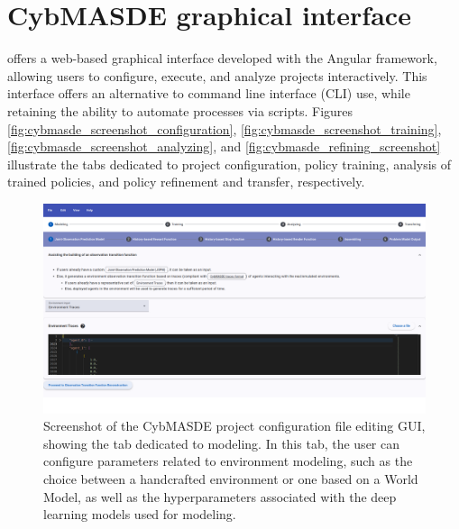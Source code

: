 \section{CybMASDE graphical interface}\label{appendix:cybmasde-gui}
 offers a web-based graphical interface developed with the Angular framework, allowing users to configure, execute, and analyze projects interactively. This interface offers an alternative to command line interface (CLI) use, while retaining the ability to automate processes via scripts. Figures \autoref{fig:cybmasde_screenshot_configuration}, \autoref{fig:cybmasde_screenshot_training}, \autoref{fig:cybmasde_screenshot_analyzing}, and \autoref{fig:cybmasde_refining_screenshot} illustrate the tabs dedicated to project configuration, policy training, analysis of trained policies, and policy refinement and transfer, respectively.
\begin{figure}[h!]
       \centering

       \includegraphics[width=\linewidth]{figures/CybMASDE_2.png}
       \caption[Screenshot of the modeling tab of the CybMASDE GUI]{Screenshot of the CybMASDE project configuration file editing GUI, showing the tab dedicated to modeling. In this tab, the user can configure parameters related to environment modeling, such as the choice between a handcrafted environment or one based on a World Model, as well as the hyperparameters associated with the deep learning models used for modeling.}

       \label{fig:cybmasde_screenshot_configuration}
\end{figure}
